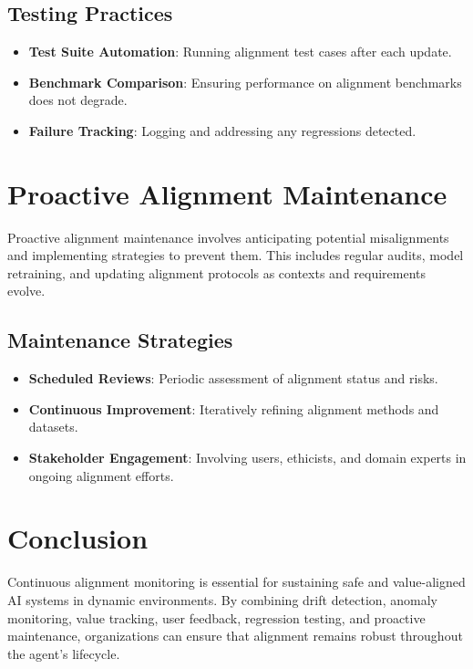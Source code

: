 \begin{TNtwocol}
\subsection{Testing Practices}
\begin{itemize}
    \item \textbf{Test Suite Automation}: Running alignment test cases after each update.
    \item \textbf{Benchmark Comparison}: Ensuring performance on alignment benchmarks does not degrade.
    \item \textbf{Failure Tracking}: Logging and addressing any regressions detected.
\end{itemize}

\section{Proactive Alignment Maintenance}
Proactive alignment maintenance involves anticipating potential misalignments and implementing strategies to prevent them. This includes regular audits, model retraining, and updating alignment protocols as contexts and requirements evolve.

\subsection{Maintenance Strategies}
\begin{itemize}
    \item \textbf{Scheduled Reviews}: Periodic assessment of alignment status and risks.
    \item \textbf{Continuous Improvement}: Iteratively refining alignment methods and datasets.
    \item \textbf{Stakeholder Engagement}: Involving users, ethicists, and domain experts in ongoing alignment efforts.
\end{itemize}

\section{Conclusion}
Continuous alignment monitoring is essential for sustaining safe and value-aligned AI systems in dynamic environments. By combining drift detection, anomaly monitoring, value tracking, user feedback, regression testing, and proactive maintenance, organizations can ensure that alignment remains robust throughout the agent’s lifecycle.

\end{TNtwocol}
